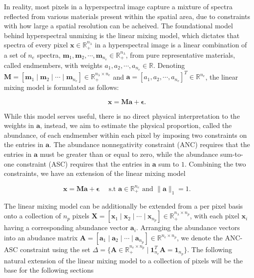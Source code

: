 In reality, most pixels in a hyperspectral image capture a mixture of spectra reflected from various materials present within the spatial area, due to constraints with how large a spatial resolution can be acheived. The foundational model behind hyperspectral unmixing is the linear mixing model, which dictates that spectra of every pixel $\mathbf{x} \in \mathbb{R}_+^{n_\lambda}$ in a hyperspectral image is a linear combination of a set of $n_e$ spectra, $\mathbf{m} _1, \mathbf{m} _2, \cdots, \mathbf{m} _{n_e} \in \mathbb{R}_+^{n_\lambda}$, from pure representative materials, called endmembers, with weights $a_1, a_2, \cdots, a_{n_e} \in \mathbb{R}$. Denoting $\mathbf{M} = [\mathbf{m} _1 \;|\; \mathbf{m} _2 \;|\; \cdots \;|\; \mathbf{m} _{n_e}] \in \mathbb{R}_+^{n_\lambda \times n_e}$ and $\mathbf{a} = [a_1, a_2, \cdots ,a_{n_e}]^T \in \mathbb{R}^{n_e}$, the linear mixing model is formulated as follows:

\begin{equation}
    \label{lmm:model}
    \mathbf{x} = \mathbf{M} \mathbf{a} + \mathbf{\epsilon}.
\end{equation}

While this model serves useful, there is no direct physical interpretation to the weights in $\mathbf{a}$, instead, we aim to estimate the physical proportion, called the abundance, of each endmember within each pixel by imposing two constraints on the entries in $\mathbf{a}$. The abundance nonnegativity constraint (ANC) requires that the entries in $\mathbf{a}$ must be greater than or equal to zero, while the abundance sum-to-one constraint (ASC) requires that the entries in $\mathbf{a}$ sum to $1$. Combining the two constraints, we have an extension of the linear mixing model

\begin{equation}
    \label{lmm:abund-lmm}
    \mathbf{x} = \mathbf{M} \mathbf{a} + \mathbf{\epsilon} \quad \text{ s.t } \mathbf{a} \in \mathbb{R}_+^{n_e} \text{ and } \|\mathbf{a}\|_1 = 1.
\end{equation}

The linear mixing model can be additionally be extended from a per pixel basis onto a collection of $n_p$ pixels $\mathbf{X} = [\mathbf{x}_1 \;|\; \mathbf{x}_2 \;|\; \cdots \;|\; \mathbf{x}_{n_p}] \in \mathbb{R}_ +^{n_\lambda \times n_p}$, with each pixel $\mathbf{x}_i$ having a corresponding abundance vector $\mathbf{a}_i$. Arranging the abundance vectors into an abudance matrix $\mathbf{A} = [\mathbf{a}_1 \;|\; \mathbf{a}_2 \;|\; \cdots \;|\; \mathbf{a}_{n_p} ] \in \mathbb{R}^{n_e \times n_p}$, we denote the ANC-ASC constraint using the set $ \Delta = \{ \mathbf{A} \in \mathbb{R}_+^{n_e \times n_p} \mid \mathbf{1}_{n_e}^T \mathbf{A} = \mathbf{1}_{n_p}\} $. The following natural extension of the linear mixing model to a collection of pixels will be the base for the following sections

